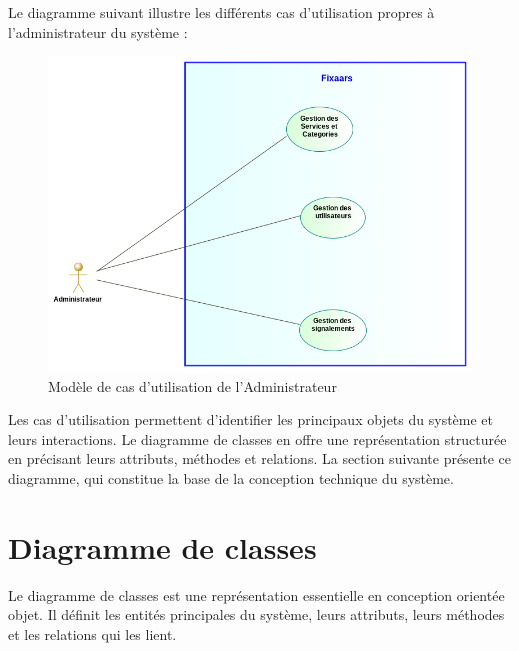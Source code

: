 {\begin{enumerate}
        \vspace{0.39cm}

        Le diagramme suivant illustre les différents cas d’utilisation
propres à l'administrateur du système :

    \vspace{0.39cm}

    \begin{figure}[H]
    \begin{center}
    \includegraphics[width=17cm]{assets/diagrams/AdminUC.png}
    \end{center}
    \caption{Modèle de cas d'utilisation de l'Administrateur}
    \end{figure}
    
    \vspace{1.39cm}
\end{enumerate}

\vspace{0.5cm}

Les cas d'utilisation permettent d’identifier les principaux objets du système et leurs interactions. Le diagramme de classes en offre une représentation structurée en précisant leurs attributs, méthodes et relations. La section suivante présente ce diagramme, qui constitue la base de la conception technique du système.


\vspace{0.35cm}


\section{Diagramme de classes}
Le diagramme de classes est une représentation essentielle en conception orientée objet. Il définit les entités principales du système, leurs attributs, leurs méthodes et les relations qui les lient.
\\

}
